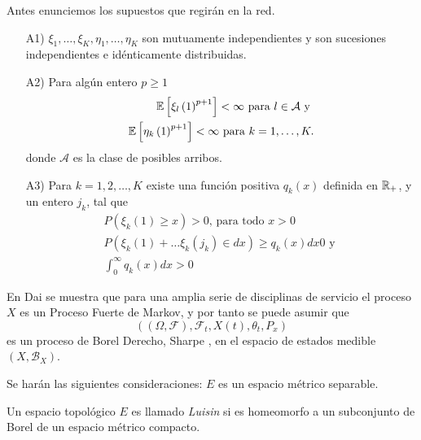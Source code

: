 Antes enunciemos los supuestos que regir\'an en la red.


\begin{itemize}
\item[A1)] $\xi_{1},\ldots,\xi_{K},\eta_{1},\ldots,\eta_{K}$ son
mutuamente independientes y son sucesiones independientes e
id\'enticamente distribuidas.

\item[A2)] Para alg\'un entero $p\geq1$
\begin{eqnarray*}
\mathbb{E}\left[\xi_{l}\left(1\right)^{p+1}\right]<\infty\textrm{ para }l\in\mathcal{A}\textrm{ y }\\
\mathbb{E}\left[\eta_{k}\left(1\right)^{p+1}\right]<\infty\textrm{ para
}k=1,\ldots,K.
\end{eqnarray*}
donde $\mathcal{A}$ es la clase de posibles arribos.

\item[A3)] Para $k=1,2,\ldots,K$ existe una funci\'on positiva
$q_{k}\left(x\right)$ definida en $\mathbb{R}_{+}$, y un entero $j_{k}$,
tal que
\begin{eqnarray}
P\left(\xi_{k}\left(1\right)\geq x\right)>0\textrm{, para todo }x>0\\
P\left(\xi_{k}\left(1\right)+\ldots\xi_{k}\left(j_{k}\right)\in dx\right)\geq q_{k}\left(x\right)dx0\textrm{ y }\\
\int_{0}^{\infty}q_{k}\left(x\right)dx>0
\end{eqnarray}
\end{itemize}

En Dai \cite{Dai} se muestra que para una amplia serie de
disciplinas de servicio el proceso $X$ es un Proceso Fuerte de
Markov, y por tanto se puede asumir que
\[\left(\left(\Omega,\mathcal{F}\right),\mathcal{F}_{t},X\left(t\right),\theta_{t},P_{x}\right)\]
es un proceso de Borel Derecho, Sharpe \cite{Sharpe}, en el
espacio de estados medible
$\left(X,\mathcal{B}_{X}\right)$.


Se har\'an las siguientes consideraciones: $E$ es un espacio
m\'etrico separable.


\begin{Def}
Un espacio topol\'ogico $E$ es llamado {\em Luisin} si es
homeomorfo a un subconjunto de Borel de un espacio m\'etrico
compacto.
\end{Def}

